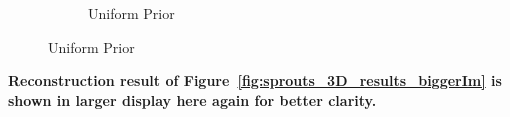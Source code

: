 \documentclass{article}
\begin{document}
\begin{figure}[!h]
    \begin{subfigure}[b]{\linewidth}
\captionsetup{labelformat=empty}
        \caption{\large{Uniform Prior}}
     \end{subfigure}
\end{figure}
\newpage
\textbf{Reconstruction result of Figure~\ref{fig:sprouts_3D_results_biggerIm}  is shown in larger display here  again for better clarity.}\\
\end{document}
